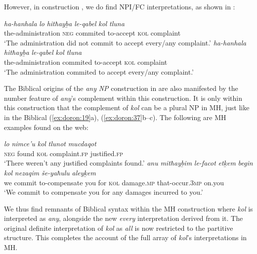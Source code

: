 \documentclass[output=paper]{langsci/langscibook}
\begin{document}
However, in construction , we do find NPI/FC interpretations, as shown in :

\ea%
    \label{ex:doron:59}
    \ea
    \gll \textit{ha-hanhala}            \textit{lo}     \textit{hitħayḇa}   \textit{le-qabel}    \textit{kol}    \textit{tluna} \\
         the-administration \textsc{neg} commited  to-accept  \textsc{kol}  complaint   \\
    \glt `The administration did not commit to accept every/any complaint.'
    \ex
    \gll \textit{ha-hanhala}             \textit{hitħayḇa}    \textit{le-qabel}    \textit{kol}    \textit{tluna}          \\
         the-administration  commited  to-accept  \textsc{kol}  complaint  \\
    \glt `The administration commited to accept every/any complaint.'
    \z
\z

The Biblical origins of the \textit{any} \textit{NP} construction in  are also manifested by the number feature of \textit{any}’s complement within this construction. It is only within this construction that the complement of \textit{kol} can be a plural NP in MH, just like in the Biblical (\ref{ex:doron:19}a), (\ref{ex:doron:37}b--c). The following are MH examples found on the web:

\ea%
    \label{ex:doron:60}
    \ea
    \gll \textit{lo}     \textit{nimce’u}     \textit{kol}    \textit{tlunot}              \textit{mucdaqot}\\
         \textsc{neg} found         \textsc{kol}  complaint.\textsc{fp}  justified.\textsc{fp} \\
    \glt `There weren’t any justified complaints found.'
    \ex
    \gll \textit{anu} \textit{mitħayḇim}  \textit{le-facot}            \textit{etḵem}  \textit{begin}  \textit{kol}   \textit{nezaqim}        \textit{še-yaħulu}            \textit{aleyḵem}   \\
         we  commit       to-compensate you       for      \textsc{kol}  damage.\textsc{mp}  that-occur.3\textsc{mp}  on.you \\
    \glt `We commit to compensate you for any damages incurred to you.'
    \z
\z

We thus find remnants of Biblical syntax within the MH  construction where  \textit{kol} is interpreted as \textit{any}, alongside the new \textit{every} interpretation derived from it. The original definite interpretation of \textit{kol} as \textit{all} is now restricted to the partitive  structure. This completes the account of the full array of \textit{kol}’s interpretations in MH.
\end{document}
